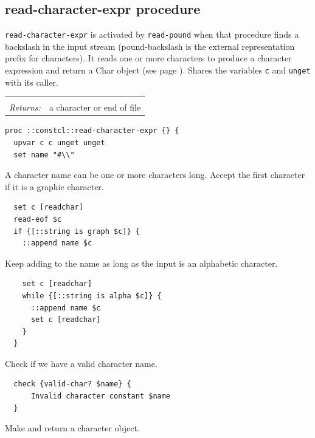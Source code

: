 \documentclass[twoside]{report}
\begin{document}
\subsection{read-character-expr procedure}
\label{readcharacterexpr-procedure}

\texttt{read-character-expr} is activated by \texttt{read-pound} when that procedure finds a backslash in the input stream (pound-backslash is the external representation prefix for characters). It reads one or more characters to produce a character expression and return a Char object (see page \pageref{characters}). Shares the variables \texttt{c} and \texttt{unget} with its caller.

\noindent\begin{tabular}{ |p{1.9cm} p{8cm}| }
\hline
\rowcolor[HTML]{CCCCCC} \multicolumn{2}{|l|}{\bf read-character-expr (internal)} \\
\textit{Returns:} & a character or end of file \\
\hline
\end{tabular}

\begin{lstlisting}
proc ::constcl::read-character-expr {} {
  upvar c c unget unget
  set name "#\\"
\end{lstlisting}

A character name can be one or more characters long. Accept the first character if it is a graphic character.

\begin{lstlisting}
  set c [readchar]
  read-eof $c
  if {[::string is graph $c]} {
    ::append name $c
\end{lstlisting}

Keep adding to the name as long as the input is an alphabetic character.

\begin{lstlisting}
    set c [readchar]
    while {[::string is alpha $c]} {
      ::append name $c
      set c [readchar]
    }
  }
\end{lstlisting}

Check if we have a valid character name.

\begin{lstlisting}
  check {valid-char? $name} {
      Invalid character constant $name
  }
\end{lstlisting}

Make and return a character object.
\end{document}
